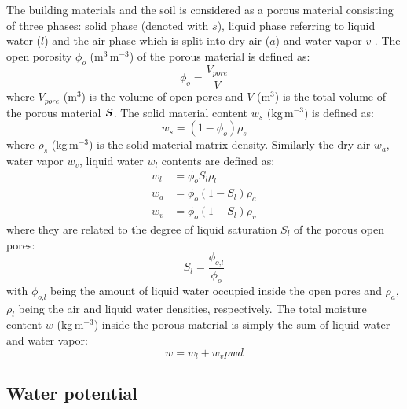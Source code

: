 The building materials and the soil is considered as a porous material consisting of three phases: solid phase (denoted with $s$), liquid phase referring to liquid water ($l$) and the air phase which is split into dry air ($a$) and water vapor $v$ \citep{Defraeye2011, Saneinejad2013, Carmeliet2005,Janssen2002}. The open porosity $\phi_o$ (m$^3$\,m$^{-3}$) of the porous material is defined as:
\begin{equation}
\phi_o = \frac{V_{\mathit{pore}}}{V}
\end{equation}
where $V_{\textit{pore}}$ (m$^3$) is the volume of open pores and $V$ (m$^3$) is the total volume of the porous material $\textbf{\textit{S}}$. The solid material content $w_s$ (kg\,m$^{-3}$) is defined as:
\begin{equation}
w_s = \left(1 - \phi_o \right) \rho_s
\end{equation}
where $\rho_s$ (kg\,m$^{-3}$) is the solid material matrix density. Similarly the dry air $w_a$, water vapor $w_v$, liquid water $w_l$ contents are defined as:
\begin{align}
w_l &= \phi_o S_l \rho_l \\
w_a &= \phi_o \left( 1 - S_l \right) \rho_a \\
w_v &= \phi_o \left( 1 - S_l \right) \rho_v
\end{align}
where they are related to the degree of liquid saturation $S_l$ of the porous open pores:
\begin{equation}
S_l = \frac{\phi_{\textit{o,l}}}{\phi_o}
\end{equation}
with $\phi_{\textit{o,l}}$ being the amount of liquid water occupied inside the open pores and $\rho_a$, $\rho_l$ being the air and liquid water densities, respectively. The total moisture content $w$ (kg\,m$^{-3}$) inside the porous material is simply the sum of liquid water and water vapor:
\begin{equation}
w = w_l + w_vpwd
\end{equation}

\subsection{Water potential}

